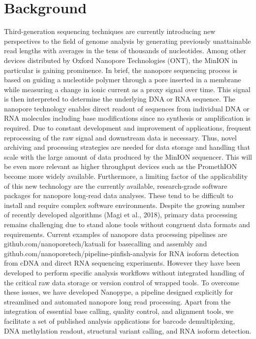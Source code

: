 \section{Background}
\label{sec:nanopype:background}
Third-generation sequencing techniques are currently introducing new perspectives to the field of genome analysis by generating previously unattainable read lengths with averages in the tens of thousands of nucleotides. Among other devices distributed by Oxford Nanopore Technologies (ONT), the MinION in particular is gaining prominence. In brief, the nanopore sequencing process is based on guiding a nucleotide polymer through a pore inserted in a membrane while measuring a change in ionic current as a proxy signal over time. This signal is then interpreted to determine the underlying DNA or RNA sequence. The nanopore technology enables direct readout of sequences from individual DNA or RNA molecules including base modifications since no synthesis or amplification is required.
Due to constant development and improvement of applications, frequent reprocessing of the raw signal and downstream data is necessary. Thus, novel archiving and processing strategies are needed for data storage and handling that scale with the large amount of data produced by the MinION sequencer. This will be even more relevant as higher throughput devices such as the PromethION become more widely available. Furthermore, a limiting factor of the applicability of this new technology are the currently available, research-grade software packages for nanopore long-read data analyses. These tend to be difficult to install and require complex software environments. Despite the growing number of recently developed algorithms (Magi et al., 2018), primary data processing remains challenging due to stand alone tools without congruent data formats and requirements. 
Current examples of nanopore data processing pipelines are github.com/nanoporetech/katuali for basecalling and assembly and github.com/nanoporetech/pipeline-pinfish-analysis for RNA isoform detection from cDNA and direct RNA sequencing experiments. However they have been developed to perform specific analysis workflows without integrated handling of the critical raw data storage or version control of wrapped tools.
To overcome these issues, we have developed Nanopype, a pipeline designed explicitly for streamlined and automated nanopore long read processing. Apart from the integration of essential base calling, quality control, and alignment tools, we facilitate a set of published analysis applications for barcode demultiplexing, DNA methylation readout, structural variant calling, and RNA isoform detection. 
